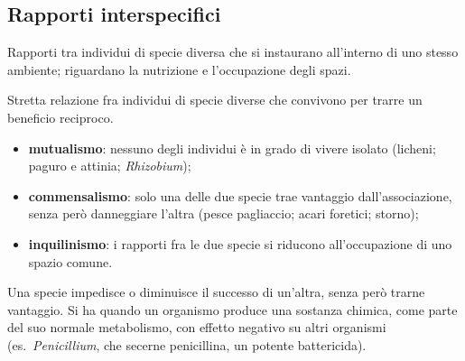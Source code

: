 \subsection{Rapporti interspecifici}

Rapporti tra individui di specie diversa che si instaurano all'interno di uno stesso ambiente; riguardano la nutrizione e l'occupazione degli spazi.

Stretta relazione fra individui di specie diverse che convivono per trarre un beneficio reciproco.
\begin{itemize}
  \item \textbf{mutualismo}: nessuno degli individui è in grado di vivere isolato (licheni; paguro e attinia; \textit{Rhizobium});
  \item \textbf{commensalismo}: solo una delle due specie trae vantaggio dall'associazione, senza però danneggiare l'altra (pesce pagliaccio; acari foretici; storno);
  \item \textbf{inquilinismo}: i rapporti fra le due specie si riducono all'occupazione di uno spazio comune.
\end{itemize}

Una specie impedisce o diminuisce il successo di un'altra, senza però trarne vantaggio. Si ha quando un organismo produce una sostanza chimica, come parte del suo normale metabolismo, con effetto negativo su altri organismi (es.\ \textit{Penicillium}, che secerne penicillina, un potente battericida).

